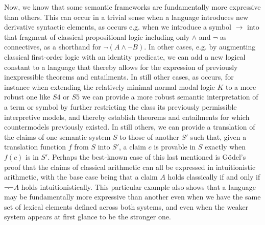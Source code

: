 \documentclass[]{article}
\begin{document}
Now, we know that some semantic frameworks are fundamentally more expressive than others. 
This can occur in a trivial sense when a language introduces new derivative syntactic elements, 
as occurs e.g. when we introduce a symbol $\rightarrow$ into that fragment of classical propositional logic including only $\wedge $ and $\neg$ as connectives, 
as a shorthand for $\neg(A \wedge \neg B)$. 
In other cases, e.g. by augmenting classical first-order logic with an identity predicate, 
we can add a new logical constant to a language that thereby allows for the expression of previously inexpressible theorems and entailments. 
In still other cases, 
as occurs, for instance when extending the relatively minimal normal modal logic $K$ to a more robust one like $S4$ or $S5$
we can provide a more robust semantic interpretation of a term or symbol by further restricting the class its previously permissible interpretive models, 
and thereby establish theorems and entailments for which countermodels previously existed.
In still others, we can provide a translation of the claims of one semantic system $S$ to those of another $S'$ 
such that, 
given a translation function $f$ from $S$ into $S'$, 
a claim $c$ is provable in $S$ exactly when  $f(c)$ is in $S'$.
Perhaps the best-known case of this last mentioned is G\"{o}del's proof that the claims of classical arithmetic can all be expressed in intuitionistic arithmetic, 
with the base case being that a claim $A$ holds classically if and only if $\neg\neg A$ holds intuitionistically. 
This particular example also shows that a language may be fundamentally more expressive than another even when we have the same set of lexical elements defined across both systems, 
and even when the weaker system appears at first glance to be the stronger one. 

\end{document}
